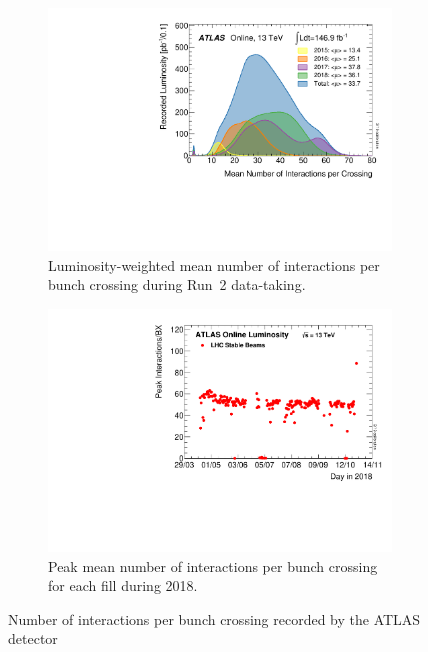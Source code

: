 \begin{figure}
	\centering
	\begin{subfigure}[b]{0.45\linewidth}
		\centering\includegraphics[width=\textwidth]{mu_2015_2018}
		\caption{Luminosity-weighted mean number of interactions per bunch crossing during Run~2 data-taking.\label{fig:mu_2015_2018}}
	\end{subfigure}%
	\begin{subfigure}[b]{0.45\linewidth}
		\centering\includegraphics[width=\textwidth]{peakMuByFill}
		\caption{Peak mean number of interactions per bunch crossing for each fill during 2018.\label{fig:peakMuByFill}}
	\end{subfigure}%
	\caption{Number of interactions per bunch crossing recorded by the ATLAS detector~\cite{ATLAS:Run2}}\label{fig:mu_run2}
\end{figure}

